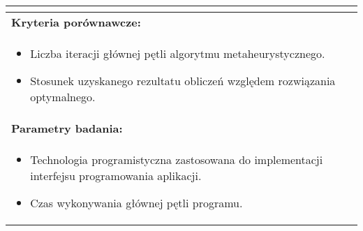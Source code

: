 \begin{longtable}[c]{|llll|}
{\begin{itemize}[label={}]
          \end{itemize}
    }                                                           \\ \hline
    \multicolumn{4}{|l|}{\textbf{Kryteria porównawcze:}}                             \\ \hline
    \multicolumn{4}{|p{\linewidth}|}{
        \begin{itemize}
            \item Liczba iteracji głównej pętli algorytmu metaheurystycznego.
            \item Stosunek uzyskanego rezultatu obliczeń względem rozwiązania optymalnego.
        \end{itemize}
    }                                                           \\ \hline
    \multicolumn{4}{|l|}{\textbf{Parametry badania:}}                                \\ \hline
    \multicolumn{4}{|p{\linewidth}|}{
        \begin{itemize}
            \item Technologia programistyczna zastosowana do implementacji interfejsu programowania aplikacji.
            \item Czas wykonywania głównej pętli programu.
        \end{itemize}
    }                                                           \\ \hline
\end{longtable}

